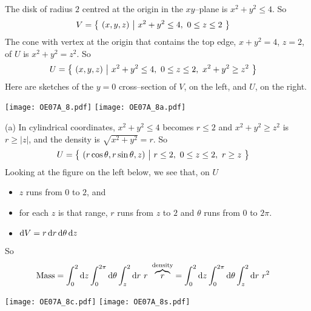 \begin{solution}
The disk of radius $2$  centred at the origin in the $xy$--plane
is $x^2+y^2\le 4$. So
\begin{align*}
V&=\big\{ \ (x,y,z)\ \big|\ x^2+y^2\le 4,\ 0\le z\le 2\ \big\} 
\end{align*}
The cone with vertex at the origin that contains the top edge,
$x+y^2=4$, $z=2$, of $U$ is $x^2+y^2=z^2$. So
\begin{align*}
U&=\big\{ \ (x,y,z)\ \big|\ x^2+y^2\le 4,\ 0\le z\le 2,\ x^2+y^2\ge z^2\ \big\}
\end{align*} 
Here are sketches of the $y=0$ cross--section of $V$, on the left,
and $U$, on the right.
\begin{center}
     \texttt{[image: OE07A\_8.pdf]}\quad
     \texttt{[image: OE07A\_8a.pdf]}
\end{center}

(a) In cylindrical coordinates, $x^2+y^2\le 4$ becomes $r\le 2$
and $x^2+y^2\ge z^2$ is $r\ge |z|$, and the density is $\sqrt{x^2+y^2}=r$. 
So 
\begin{align*}
U&=\big\{ \ (r\cos\theta,r\sin\theta,z)\ \big|\ r\le 2,\ 0\le z\le 2,\ r\ge z\ \big\}
\end{align*}
Looking at the figure on the left below, we see that, on $U$
\begin{itemize}
\item 
  $z$ runs from $0$ to $2$, and
\item
  for each $z$ is that range, $r$ runs from $z$ to $2$
  and $\theta$ runs from $0$ to $2\pi$.
\item $\mathrm{d}V =r\,\mathrm{d}r\,\mathrm{d}\theta\,\mathrm{d}z$
\end{itemize}
So
\begin{align*}
\text{Mass}&= \int_0^2\dee{z}\int_0^{2\pi}\dee{\theta}\int_z^2\dee{r}\ 
                  r\ \overbrace{r}^{\text{density}}
= \int_0^2\dee{z}\int_0^{2\pi}\dee{\theta}\int_z^2\dee{r}\ 
                  r^2
\end{align*}

\begin{center}
     \texttt{[image: OE07A\_8c.pdf]}\quad
     \texttt{[image: OE07A\_8s.pdf]}
\end{center}


\end{solution}
